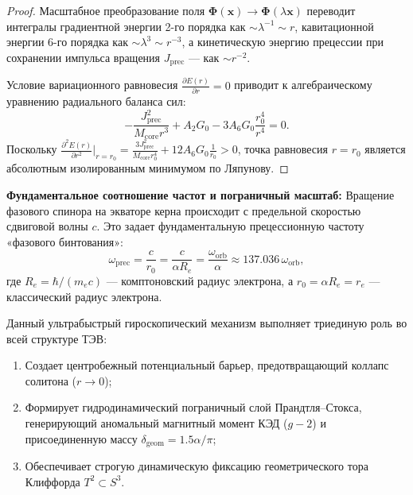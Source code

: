 \documentclass[12pt,a4paper]{article}
\theoremstyle{definition}
\theoremstyle{remark}
\begin{document}
\begin{proof}
	Масштабное преобразование поля $\boldsymbol{\Phi}(\mathbf{x}) \to \boldsymbol{\Phi}(\lambda \mathbf{x})$ переводит интегралы градиентной энергии 2-го порядка как $\sim \lambda^{-1} \sim r$, кавитационной энергии 6-го порядка как $\sim \lambda^3 \sim r^{-3}$, а кинетическую энергию прецессии при сохранении импульса вращения $J_{\mathrm{prec}}$ --- как $\sim r^{-2}$.
	
	Условие вариационного равновесия $\frac{\partial E(r)}{\partial r} = 0$ приводит к алгебраическому уравнению радиального баланса сил:
	\begin{equation}
		-\frac{J_{\mathrm{prec}}^2}{M_{\mathrm{core}} r^3} + A_2 G_0 - 3 A_6 G_0 \frac{r_0^4}{r^4} = 0.
		\label{eq:derrick_eq}
	\end{equation}
	Поскольку $\frac{\partial^2 E(r)}{\partial r^2}\Big|_{r=r_0} = \frac{3 J_{\mathrm{prec}}^2}{M_{\mathrm{core}} r_0^4} + 12 A_6 G_0 \frac{1}{r_0} > 0$, точка равновесия $r = r_0$ является абсолютным изолированным минимумом по Ляпунову.
\end{proof}

\textbf{Фундаментальное соотношение частот и пограничный масштаб:}
Вращение фазового спинора на экваторе керна происходит с предельной скоростью сдвиговой волны $c$. Это задает фундаментальную прецессионную частоту «фазового бинтования»:
\begin{equation}
	\omega_{\mathrm{prec}} = \frac{c}{r_0} = \frac{c}{\alpha R_e} = \frac{\omega_{\mathrm{orb}}}{\alpha} \approx 137.036 \, \omega_{\mathrm{orb}},
	\label{eq:prec_frequency}
\end{equation}
где $R_e = \hbar / (m_e c)$ --- комптоновский радиус электрона, а $r_0 = \alpha R_e = r_e$ --- классический радиус электрона. 

Данный ультрабыстрый гироскопический механизм выполняет триединую роль во всей структуре ТЭВ:
\begin{enumerate}
	\item Создает центробежный потенциальный барьер, предотвращающий коллапс солитона ($r \to 0$);
	\item Формирует гидродинамический пограничный слой Прандтля--Стокса, генерирующий аномальный магнитный момент КЭД ($g-2$) и присоединенную массу $\delta_{\mathrm{geom}} = 1.5\alpha/\pi$;
	\item Обеспечивает строгую динамическую фиксацию геометрического тора Клиффорда $T^2 \subset S^3$.
\end{enumerate}
\end{document}
